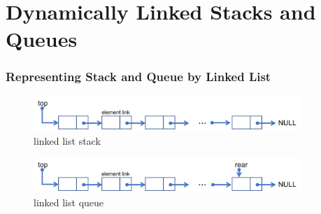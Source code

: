 \documentclass[newPxFont,sthlmFooter,nooffset]{beamer}
\begin{document}
\section{Dynamically Linked Stacks and Queues}
\begin{frame}[t]
  \frametitle{Representing Stack and Queue by Linked List}
  \begin{figure}
    \centering
    \includegraphics[width=0.9\textwidth]{figures/fig07_stack_list.png}
     \caption{linked list stack}
\end{figure}
\bigskip
\begin{figure}
  \centering
  \includegraphics[width=0.9\textwidth]{figures/fig07_queue_list.png}
  \caption{linked list queue}
\end{figure}
\end{frame}
\end{document}

